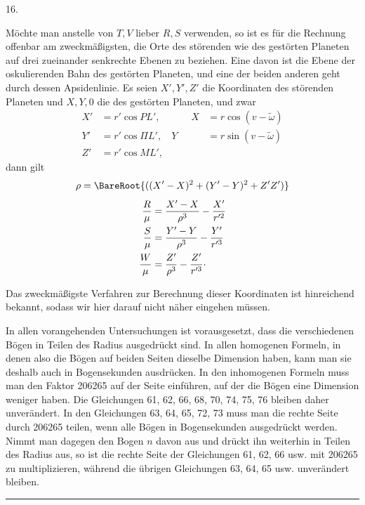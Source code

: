 \par{}\bigskip
{}
\begin{center}16.\end{center}
\noindent\hspace*{\parindent}Möchte man anstelle von \(T,V\) lieber \(R,S\) verwenden, so ist es für die Rechnung offenbar am zweckmäßigsten, die Orte des störenden wie des gestörten Planeten auf drei zueinander senkrechte Ebenen zu beziehen. Eine davon ist die Ebene der oskulierenden Bahn des gestörten Planeten, und eine der beiden anderen geht durch dessen Apsidenlinie. Es seien \(X',Y',Z'\) die Koordinaten des störenden Planeten und \(X,Y,0\) die des gestörten Planeten, und zwar
\[
\begin{aligned}
X'&=r'\cos PL',&\qquad X&=r\cos(v-\tilde\omega)\\
Y'&=r'\cos\Pi L',&Y&=r\sin(v-\tilde\omega)\\
Z'&=r'\cos ML',&&
\end{aligned}
\]
dann gilt
\[
\begin{gathered}
\rho=\BareRoot{((X'-X)^2+(Y'-Y)^2+Z'Z')}\\[4pt]
\begin{aligned}
\dfrac{R}{\mu}&=\dfrac{X'-X}{\rho^3}-\dfrac{X'}{r'^2}\\
\dfrac{S}{\mu}&=\dfrac{Y'-Y}{\rho^3}-\dfrac{Y'}{r'^3}\\
\dfrac{W}{\mu}&=\dfrac{Z'}{\rho^3}-\dfrac{Z'}{r'^3}\mathpunct{\cdot}
\end{aligned}
\end{gathered}
\]
\par Das zweckmäßigste Verfahren zur Berechnung dieser Koordinaten ist hinreichend bekannt, sodass wir hier darauf nicht näher eingehen müssen.
\par In allen vorangehenden Untersuchungen ist vorausgesetzt, dass die verschiedenen Bögen in Teilen des Radius ausgedrückt sind. In allen homogenen Formeln, in denen also die Bögen auf beiden Seiten dieselbe Dimension haben, kann man sie deshalb auch in Bogensekunden ausdrücken. In den inhomogenen Formeln muss man den Faktor 206265 auf der Seite einführen, auf der die Bögen eine Dimension weniger haben. Die Gleichungen 61, 62, 66, 68, 70, 74, 75, 76 bleiben daher unverändert. In den Gleichungen 63, 64, 65, 72, 73 muss man die rechte Seite durch 206265 teilen, wenn alle Bögen in Bogensekunden ausgedrückt werden. Nimmt man dagegen den Bogen \(n\) davon aus und drückt ihn weiterhin in Teilen des Radius aus, so ist die rechte Seite der Gleichungen 61, 62, 66 usw. mit 206265 zu multiplizieren, während die übrigen Gleichungen 63, 64, 65 usw. unverändert bleiben.
\par\medskip\begin{center}\rule{4em}{.4pt}\end{center}
